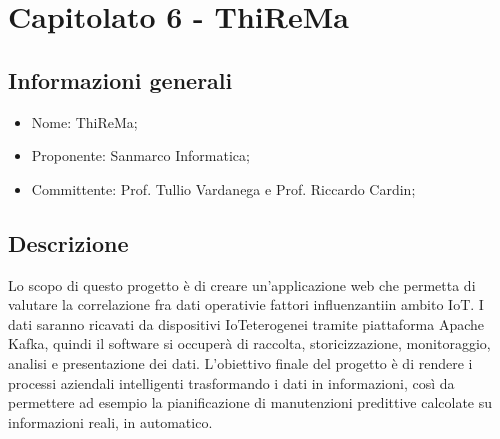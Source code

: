 \section{Capitolato 6 - ThiReMa}
\subsection{Informazioni generali}
\begin{itemize}
	\item Nome: ThiReMa;
	\item Proponente: Sanmarco Informatica;
	\item Committente: Prof. Tullio Vardanega e Prof. Riccardo Cardin;
\end{itemize}
\subsection{Descrizione}
Lo scopo di questo progetto è di creare un'applicazione web che permetta di valutare la correlazione fra dati operativi\glosp e fattori influenzanti\glo in ambito IoT\glo. I dati saranno ricavati da dispositivi IoT\glosp eterogenei tramite piattaforma Apache Kafka\glo, quindi il software si occuperà di raccolta, storicizzazione, monitoraggio, analisi e presentazione dei dati.
L'obiettivo finale del progetto è di rendere i processi aziendali intelligenti trasformando i dati in informazioni, così da permettere ad esempio la pianificazione di manutenzioni predittive calcolate su informazioni reali, in automatico.


